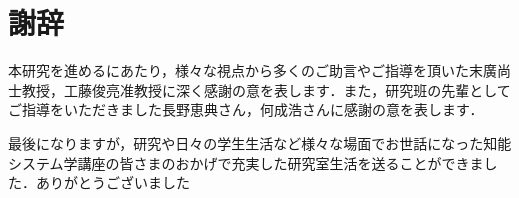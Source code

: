 \chapter*{謝辞} \label{seq:謝辞}

本研究を進めるにあたり，様々な視点から多くのご助言やご指導を頂いた末廣尚士教授，工藤俊亮准教授に深く感謝の意を表します．また，研究班の先輩としてご指導をいただきました長野恵典さん，何成浩さんに感謝の意を表します．
\par
最後になりますが，研究や日々の学生生活など様々な場面でお世話になった知能システム学講座の皆さまのおかげで充実した研究室生活を送ることができました．ありがとうございました